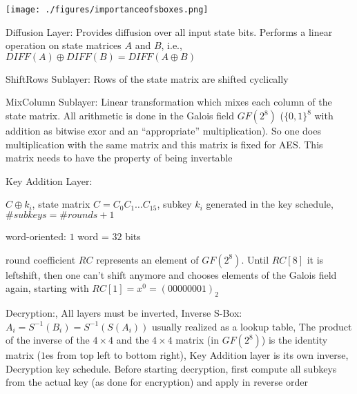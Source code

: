 \documentclass[landscape, a4paper]{article}
\begin{document}
\begin{minipage}[t]{0.2\linewidth}
\begin{betterlist}
\begin{betterlist}
\begin{betterlist}
				\texttt{[image: ./figures/importanceofsboxes.png]}
			\end{betterlist}
			\item \alert{Diffusion Layer:} Provides diffusion over all input state bits. Performs a linear operation on state matrices $A$ and $B$, i.e., $DIFF(A) \oplus DIFF(B) = DIFF(A \oplus B)$
			\begin{betterlist}
				\item \alert{ShiftRows Sublayer:} Rows of the state matrix are shifted cyclically
				\item \alert{MixColumn Sublayer:} Linear transformation which mixes each column of the state matrix. All arithmetic is done in the Galois field $GF(2^8)$ ($\{0, 1\}^8$ with addition as bitwise exor and an \enquote{appropriate} multiplication). So one does multiplication with the same matrix and this matrix is fixed for AES. This matrix needs to have the property of being \alert{invertable}
			\end{betterlist}
			\item \alert{Key Addition Layer:}
			\begin{betterlist}
				\item $C \oplus k_i$, state matrix $C = C_0C_1\ldots C_{15}$, \alert{subkey} $k_i$ generated in the \alert{key schedule}, $\#subkeys = \#rounds + 1$
				\item \alert{word-oriented:} $1$ word = $32$ bits
				\item \alert{round coefficient} $RC$ represents an element of $GF(2^8)$. Until $RC[8]$ it is leftshift, then one can't shift anymore and chooses elements of the Galois field again, starting with $RC[1] = x^0 = (00000001)_2$
			\end{betterlist}
		\end{betterlist}
		\item \alert{Decryption:}, All layers must be inverted, Inverse S-Box: $A_i = S^{-1}(B_i) = S^{-1}(S(A_i))$ usually realized as a lookup table, The product of the inverse of the $4\times 4$ and the $4\times 4$ matrix (in $GF(2^8)$) is the identity matrix ($1$es from top left to bottom right), Key Addition layer is its own inverse, Decryption key schedule. Before starting decryption, first compute all subkeys from the actual key (as done for encryption) and apply in reverse order


\end{betterlist}
\end{minipage}
\end{document}
